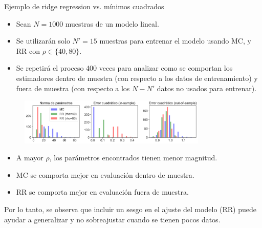 \documentclass[handout, 9pt]{beamer}
\begin{document}
\begin{frame}{Ejemplo de ridge regression vs. mínimos cuadrados}

\begin{itemize}
	\item Sean $N=1000$ muestras de un modelo lineal.\pause
	\item Se utilizarán solo $N'=15$ muestras para entrenar el modelo usando MC, y RR con $\rho\in\{40,80\}$.\pause
	\item Se repetirá el proceso 400 veces para analizar como se comportan los estimadores dentro de muestra (con respecto a los datos de entrenamiento) y fuera de muestra (con respecto a los $N-N'$ datos no usados para entrenar).\pause
\end{itemize}
	
\begin{figure}[H]
	\centering
	\includegraphics[width=0.8\textwidth]{../../img/cap2_bias-variance.pdf}\\
	\label{fig:MCvsRR_Synth}  
\end{figure}\pause

\begin{itemize}
	\item A mayor $\rho$, los parámetros encontrados tienen menor magnitud.\pause
	\item MC se comporta mejor en evaluación dentro de muestra.\pause
	\item RR se comporta mejor en evaluación fuera de muestra.\pause
\end{itemize}

Por lo tanto, se observa que incluir un sesgo en el ajuste del modelo (RR) puede ayudar a generalizar y no sobreajustar cuando se tienen pocos datos. 
		
\end{frame}
\end{document}
